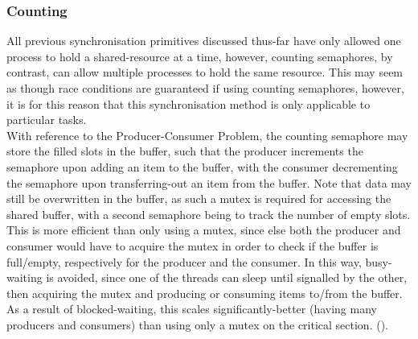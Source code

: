 \subsubsection{Counting}
\label{CountingSemaphores}
All previous synchronisation primitives discussed thus-far have only allowed one process to hold a shared-resource at a time, however, counting semaphores, by contrast, can allow multiple processes to hold the same resource. This may seem as though race conditions are guaranteed if using counting semaphores, however, it is for this reason that this synchronisation method is only applicable to particular tasks.\\
With reference to the Producer-Consumer Problem, the counting semaphore may store the filled slots in the buffer, such that the producer increments the semaphore upon adding an item to the buffer, with the consumer decrementing the semaphore upon transferring-out an item from the buffer. Note that data may still be overwritten in the buffer, as such a mutex is required for accessing the shared buffer, with a second semaphore being to track the number of empty slots. This is more efficient than only using a mutex, since else both the producer and consumer would have to acquire the mutex in order to check if the buffer is full/empty, respectively for the producer and the consumer. In this way, busy-waiting is avoided, since one of the threads can sleep until signalled by the other, then acquiring the mutex and producing or consuming items to/from the buffer. As a result of blocked-waiting, this scales significantly-better (having many producers and consumers) than using only a mutex on the critical section. (\cite{geeksSemaphore}).

